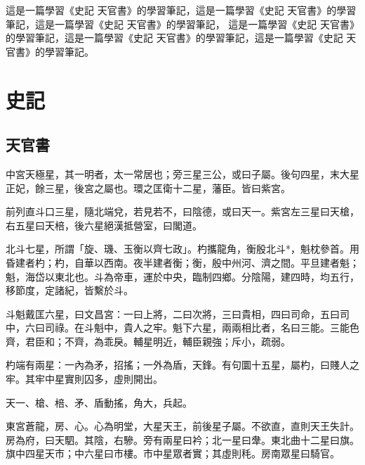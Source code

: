 \documentclass[10pt,fontset=adobe,UTF8,twoside]{ctexrep}
\begin{document}
\pagestyle{fancy}
\fancyhf{}
\fancyhead[RE]{\normalfont\small\hei\nouppercase{\leftmark}}
\fancyhead[LO]{\normalfont\small\kai\nouppercase{\rightmark}}
\fancyhead[LE,RO]{\thepage}

\makeatletter
\@openrightfalse
\makeatother


\begin{cabstract}
   這是一篇學習《史記 天官書》的學習筆記，這是一篇學習《史記 天官書》的學習筆記，這是一篇學習《史記 天官書》的學習筆記，
   這是一篇學習《史記 天官書》的學習筆記，這是一篇學習《史記 天官書》的學習筆記，這是一篇學習《史記 天官書》的學習筆記。
\end{cabstract}

\tableofcontents
\listofalgorithms
{}
\setcounter{page}{1}
\newpage
{}
\setcounter{page}{1}
\chapter{史記}

\section{天官書}

中宮天極星，其一明者，太一常居也；旁三星三公，或曰子屬。後句四星，末大星正妃，餘三星，後宮之屬也。環之匡衛十二星，藩臣。皆曰紫宮。

前列直斗口三星，隨北端兌，若見若不，曰陰德，或曰天一。紫宮左三星曰天槍，右五星曰天棓，後六星絕漢抵營室，曰閣道。

北斗七星，所謂「旋、璣、玉衡以齊七政」。杓攜龍角，衡殷北斗*，魁枕參首。用昏建者杓；杓，自華以西南。夜半建者衡；衡，殷中州河、濟之間。平旦建者魁；魁，海岱以東北也。斗為帝車，運於中央，臨制四鄉。分陰陽，建四時，均五行，移節度，定諸紀，皆繫於斗。

斗魁戴匡六星，曰文昌宮：一曰上將，二曰次將，三曰貴相，四曰司命，五曰司中，六曰司祿。在斗魁中，貴人之牢。魁下六星，兩兩相比者，名曰三能。三能色齊，君臣和；不齊，為乖戾。輔星明近，輔臣親強；斥小，疏弱。

杓端有兩星：一內為矛，招搖；一外為盾，天鋒。有句圜十五星，屬杓，曰賤人之牢。其牢中星實則囚多，虛則開出。

天一、槍、棓、矛、盾動搖，角大，兵起。

東宮蒼龍，房、心。心為明堂，大星天王，前後星子屬。不欲直，直則天王失計。房為府，曰天駟。其陰，右驂。旁有兩星曰衿；北一星曰舝。東北曲十二星曰旗。旗中四星天市；中六星曰市樓。市中星眾者實；其虛則秏。房南眾星曰騎官。
\end{document}
